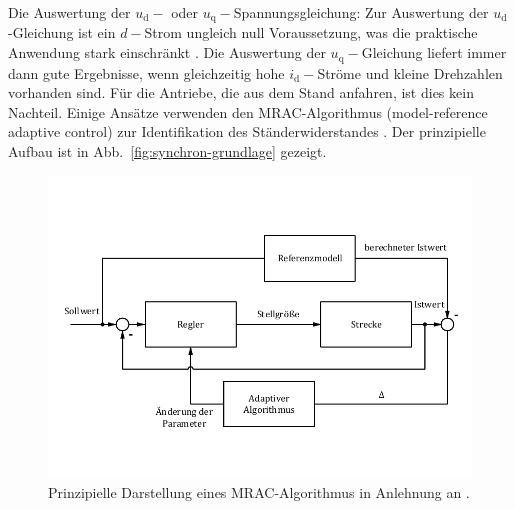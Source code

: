 \documentclass[conference,twocolumn]{IEEEtran}
\newcommand{\x}[1]{\mathrm{#1}}
\begin{document}
Die Auswertung der $u_\x{d}-$ oder $u_\x{q}-$Spannungsgleichung: Zur Auswertung der $u_\x{d}$-Gleichung ist ein $d-$Strom ungleich null Voraussetzung, was die praktische Anwendung stark einschränkt \autocite{Kellner2012}.
Die Auswertung der $u_\x{q}-$Gleichung liefert immer dann gute Ergebnisse, wenn gleichzeitig hohe $i_\x{d}-$Ströme und kleine Drehzahlen vorhanden sind.
Für die Antriebe, die aus dem Stand anfahren, ist dies kein Nachteil.
Einige Ansätze verwenden den MRAC-Algorithmus (model-reference adaptive control) zur Identifikation des Ständerwiderstandes \autocite{slotine_applied_1991}.
Der prinzipielle Aufbau ist in Abb.~\ref{fig:synchron-grundlage} gezeigt.

\begin{figure}[h!]
\centering
\includegraphics[width=\columnwidth]{img/mrac}
\caption{Prinzipielle Darstellung eines MRAC-Algorithmus in Anlehnung an \textcite{slotine_applied_1991}.}
\label{fig:mrac}
\end{figure}
\end{document}
